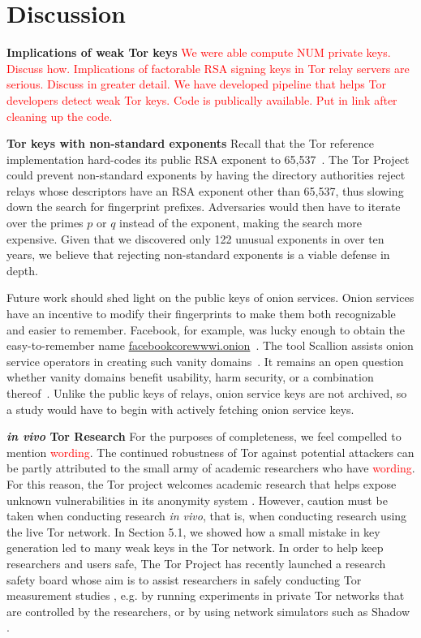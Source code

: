 \section{Discussion}
\label{sec:discussion}
\textbf{Implications of weak Tor keys} \textcolor{red}{We were able compute NUM private keys. Discuss how. Implications of factorable RSA signing keys in Tor relay servers are serious. Discuss in greater detail. We have developed pipeline that helps Tor developers detect weak Tor keys. Code is publically available. Put in link after cleaning up the code.}

\textbf{Tor keys with non-standard exponents} Recall that the Tor reference implementation hard-codes its public RSA exponent
to 65,537~\cite[\S~0.3]{torspec}.  The Tor Project could prevent non-standard
exponents by having the directory authorities reject relays whose descriptors
have an RSA exponent other than 65,537, thus slowing down the search for
fingerprint prefixes.  Adversaries would then have to iterate over the primes
$p$ or $q$ instead of the exponent, making the search more expensive.  Given
that we discovered only 122 unusual exponents in over ten years, we believe that
rejecting non-standard exponents is a viable defense in depth.

Future work should shed light on the public keys of onion services.  Onion
services have an incentive to modify their fingerprints to make them both
recognizable and easier to remember.  Facebook, for example, was lucky enough to
obtain the easy-to-remember name \url{facebookcorewwwi.onion}~\cite{facebook}.
The tool Scallion assists onion service operators in creating such vanity
domains~\cite{scallion}.  It remains an open question whether vanity domains
benefit usability, harm security, or a combination
thereof~\cite{vanity-domains}.  Unlike the public keys of relays, onion service
keys are not archived, so a study would have to begin with actively fetching
onion service keys.

\textbf{\textit{in vivo} Tor Research} For the purposes of completeness, we feel compelled to mention \textcolor{red}{wording}. The continued robustness of Tor against potential attackers can be partly attributed to the small army of academic researchers who have \textcolor{red}{wording}. For this reason, the Tor project welcomes academic research that helps expose unknown vulnerabilities in its anonymity system \cite{torresearch}. However, caution must be taken when conducting research \textit{in vivo}, that is, when conducting research using the live Tor network. In Section 5.1, we showed how a small mistake in key generation led to many weak keys in the Tor network. In order to help keep researchers and users safe, The Tor Project has recently launched a research safety board whose aim is to assist researchers in safely conducting Tor measurement studies \cite{vanity-domains}, e.g. by running experiments in private Tor networks that are controlled by the researchers, or by using network simulators such as Shadow \cite{stem}.
